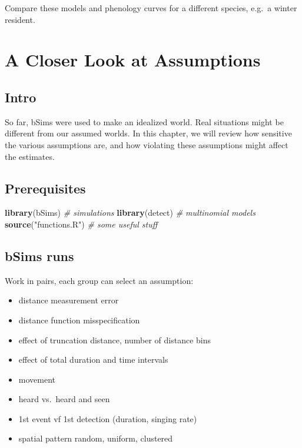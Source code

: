 \documentclass[12pt,]{book}
\newenvironment{Shaded}{\begin{snugshade}}{\end{snugshade}}
\newcommand{\CommentTok}[1]{\textcolor[rgb]{0.56,0.35,0.01}{\textit{#1}}}
\newcommand{\KeywordTok}[1]{\textcolor[rgb]{0.13,0.29,0.53}{\textbf{#1}}}
\newcommand{\NormalTok}[1]{#1}
\newcommand{\StringTok}[1]{\textcolor[rgb]{0.31,0.60,0.02}{#1}}
\providecommand{\tightlist}{%
  \setlength{\itemsep}{0pt}\setlength{\parskip}{0pt}}
\begin{document}
Compare these models and phenology curves for a different species,
e.g.~a winter resident.

\hypertarget{assumptions}{%
\chapter{A Closer Look at Assumptions}\label{assumptions}}

\hypertarget{intro-1}{%
\section{Intro}\label{intro-1}}

So far, bSims were used to make an idealized world.
Real situations might be different from our assumed worlds.
In this chapter, we will review how sensitive the various assumptions
are, and how violating these assumptions might affect the estimates.

\hypertarget{prerequisites-5}{%
\section{Prerequisites}\label{prerequisites-5}}

\begin{Shaded}
\begin{Highlighting}[]
\KeywordTok{library}\NormalTok{(bSims)                }\CommentTok{# simulations}
\KeywordTok{library}\NormalTok{(detect)               }\CommentTok{# multinomial models}
\KeywordTok{source}\NormalTok{(}\StringTok{"functions.R"}\NormalTok{)         }\CommentTok{# some useful stuff}
\end{Highlighting}
\end{Shaded}

\hypertarget{bsims-runs}{%
\section{bSims runs}\label{bsims-runs}}

Work in pairs, each group can select an assumption:

\begin{itemize}
\tightlist
\item
  distance measurement error
\item
  distance function misspecification
\item
  effect of truncation distance, number of distance bins
\item
  effect of total duration and time intervals
\item
  movement
\item
  heard vs.~heard and seen
\item
  1st event vf 1st detection (duration, singing rate)
\item
  spatial pattern random, uniform, clustered
\end{itemize}
\end{document}
